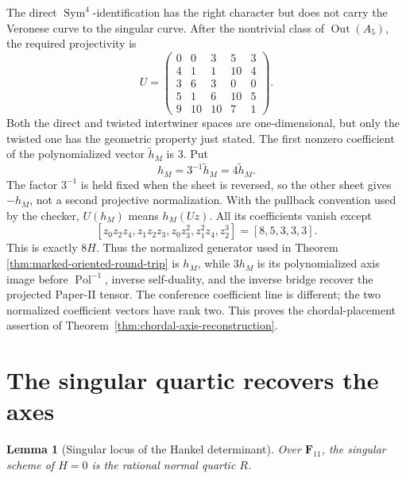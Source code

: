 \documentclass[11pt]{article}
\newtheorem{lemma}[theorem]{Lemma}
\theoremstyle{definition}
\theoremstyle{remark}
\newcommand{\F}{\mathbf F}
\newcommand{\Sym}{\operatorname{Sym}}
\begin{document}
The direct \(\Sym^4\)-identification has the right character but does not
carry the Veronese curve to the singular curve.  After the nontrivial class
of \(\operatorname{Out}(A_5)\), the required projectivity is
\[
 U=\begin{pmatrix}
 0&0&3&5&3\\
 4&1&1&10&4\\
 3&6&3&0&0\\
 5&1&6&10&5\\
 9&10&10&7&1
 \end{pmatrix}.
\]
Both the direct and twisted intertwiner spaces are one-dimensional, but only
the twisted one has the geometric property just stated.  The first nonzero
coefficient of the polynomialized vector \(\widetilde h_M\) is \(3\).  Put
\[
 h_M=3^{-1}\widetilde h_M=4\widetilde h_M.
\]
The factor \(3^{-1}\) is held fixed when the sheet is reversed, so the other
sheet gives \(-h_M\), not a second projective normalization.  With the
pullback convention used by the checker, \(U(h_M)\) means
\(h_M(Uz)\).  All its coefficients vanish except
\[
 [z_0z_2z_4,z_1z_2z_3,z_0z_3^2,z_1^2z_4,z_2^3]
   =[8,5,3,3,3].
\]
This is exactly \(8H\).  Thus the normalized generator used in Theorem
\ref{thm:marked-oriented-round-trip} is \(h_M\), while \(3h_M\) is its
polynomialized axis image before \(\operatorname{Pol}^{-1}\), inverse
self-duality, and the inverse bridge recover the projected Paper-II tensor.
The conference coefficient line is different; the
two normalized coefficient vectors have rank two.  This proves the
chordal-placement assertion of
Theorem~\ref{thm:chordal-axis-reconstruction}.

\section{The singular quartic recovers the axes}
\label{sec:singular}

\begin{lemma}[Singular locus of the Hankel determinant]
\label{lem:hankel-singular-locus}
Over \(\F_{11}\), the singular scheme of \(H=0\) is the rational normal
quartic \(R\).
\end{lemma}
\end{document}
